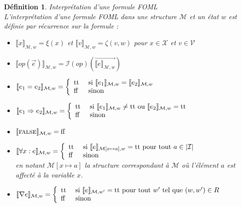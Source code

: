 \documentclass[12pt]{article}
\newcommand{\false}{\textup{ff}}
\newcommand{\true}{\textup{tt}}
\newcommand{\M}{\ensuremath{\mathcal{M}}}
\newcommand{\I}{\ensuremath{\mathcal{I}}}
\newcommand{\FALSE}{\textsc{false}}
\newtheorem{defin}{Définition}
\begin{document}
\begin{defin} \emph{Interprétation d'une formule FOML} \\
  L'interprétation d'une formule FOML dans une structure $\M$ et un état $w$ est définie par récurrence sur la formule :
  \begin{itemize}
  \item
    $\llbracket x \rrbracket_{\M, w} = \xi(x)$ et $\llbracket v \rrbracket_{\M, w} = \zeta(v, w)$ pour $x \in \mathcal{X}$ et $v \in \mathcal{V}$
  \item
    $\llbracket op(\vec{e}) \rrbracket_{\M, w} = \I(op)(\vec{\llbracket e \rrbracket_{\M, w}})$
  \item
    $\llbracket e_1 = e_2 \rrbracket_{\M, w} = \left \{
      \begin{array}{l l}
        \true & \textup{ si } \llbracket e_1 \rrbracket_{\M, w} = \llbracket e_2 \rrbracket_{\M, w} \\
        \false & \textup{ sinon }
      \end{array} \right .$
  \item
    $\llbracket e_1 \Rightarrow e_2 \rrbracket_{\M, w} = \left \{
      \begin{array}{l l}
        \true & \textup{ si } \llbracket e_1 \rrbracket_{\M, w} \neq \true \textup{ ou }
                \llbracket e_2 \rrbracket_{\M, w} = \true \\
        \false & \textup{ sinon }
      \end{array} \right .$
  \item
    $\llbracket \FALSE \rrbracket_{\M, w} = \false$
  \item
    $\llbracket \forall x : e \rrbracket_{\M, w} = \left \{
      \begin{array}{l l}
        \true & \textup{ si } \llbracket e \rrbracket_{\M[x \mapsto a], w} = \true \textup{ pour tout } a \in |\I| \\
        \false & \textup{ sinon }
      \end{array} \right .$\\
    en notant $\M[x \mapsto a]$ la structure correspondant à $\M$ où l'élément $a$ est affecté à la variable $x$.
  \item
    $\llbracket \nabla e \rrbracket_{\M, w} = \left \{
      \begin{array}{l l}
        \true & \textup{ si } \llbracket e \rrbracket_{\M, w'} = \true \textup{ pour tout $w'$ tel que } (w, w') \in R \\
        \false & \textup{ sinon }
      \end{array} \right .$
  \end{itemize}
\end{defin}
\end{document}
